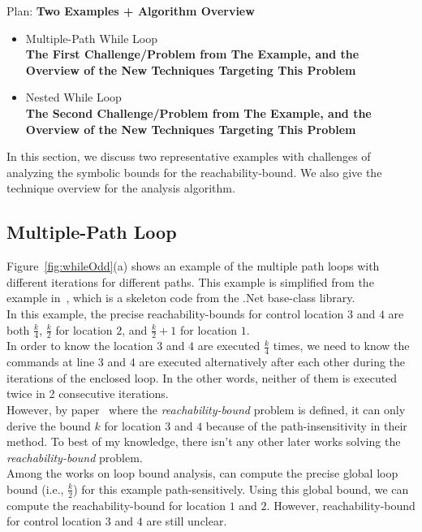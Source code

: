 Plan:
\textbf{Two Examples + Algorithm Overview}
\begin{itemize}
\item {Multiple-Path While Loop}
\\
\textbf{The First Challenge/Problem from The Example, 
and the Overview of the New Techniques Targeting This Problem}
\item {Nested While Loop}
\\
\textbf{The Second Challenge/Problem from The Example,
and the Overview of the New Techniques Targeting This Problem}
\end{itemize}
In this section, we discuss two representative examples with
challenges of analyzing the symbolic bounds for the reachability-bound.
We also give the technique overview for the analysis algorithm.
%
\subsection{Multiple-Path Loop}
\label{sec:overview-multiplepath}

Figure~\ref{fig:whileOdd}(a) shows an example of the multiple path loops
with different iterations for different paths.
This example is simplified from the example in~\cite{Sumit2010rechability}, which
is a skeleton code from the .Net base-class library.
\\
In this example,
the precise reachability-bounds for control location $3$ and $4$ are both $\frac{k}{4}$,
$\frac{k}{2}$ for location $2$, and $\frac{k}{2} + 1$ for location $1$.
\\
In order to know the location $3$ and $4$ are executed $\frac{k}{4}$ times,
we need to know the commands at line $3$ and $4$ are executed alternatively after each other
during the iterations of the enclosed loop.
In the other words, neither of them is executed twice in 2 consecutive iterations.
\\
However, by paper~\cite{Sumit2010rechability} where the \emph{reachability-bound} problem is defined,
it can only derive the bound $k$ for location $3$ and $4$ because of the path-insensitivity in their method.
To best of my knowledge, there isn't any other later works solving the \emph{reachability-bound} problem.
\\
Among the works on loop bound analysis, \cite{GulwaniJK09} can compute the precise global
loop bound (i.e., $\frac{k}{2}$) for this example path-sensitively.
Using this global bound, we can compute the reachability-bound for location $1$ and $2$.
However, reachability-bound for control location $3$ and $4$ are still unclear.
